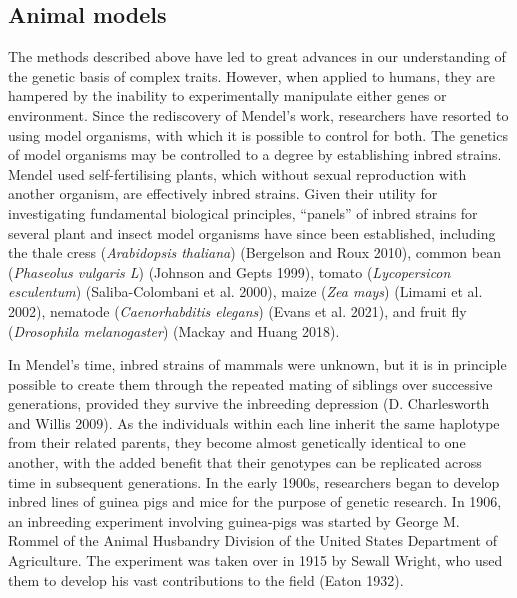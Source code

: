 \documentclass[
]{book}
\begin{document}
\hypertarget{animal-models}{%
\subsection{Animal models}\label{animal-models}}

The methods described above have led to great advances in our understanding of the genetic basis of complex traits. However, when applied to humans, they are hampered by the inability to experimentally manipulate either genes or environment. Since the rediscovery of Mendel's work, researchers have resorted to using model organisms, with which it is possible to control for both. The genetics of model organisms may be controlled to a degree by establishing inbred strains. Mendel used self-fertilising plants, which without sexual reproduction with another organism, are effectively inbred strains. Given their utility for investigating fundamental biological principles, ``panels'' of inbred strains for several plant and insect model organisms have since been established, including the thale cress (\emph{Arabidopsis thaliana}) (Bergelson and Roux 2010), common bean (\emph{Phaseolus vulgaris L}) (Johnson and Gepts 1999), tomato (\emph{Lycopersicon esculentum}) (Saliba-Colombani et al. 2000), maize (\emph{Zea mays}) (Limami et al. 2002), nematode (\emph{Caenorhabditis elegans}) (Evans et al. 2021), and fruit fly (\emph{Drosophila melanogaster}) (Mackay and Huang 2018).

In Mendel's time, inbred strains of mammals were unknown, but it is in principle possible to create them through the repeated mating of siblings over successive generations, provided they survive the inbreeding depression (D. Charlesworth and Willis 2009). As the individuals within each line inherit the same haplotype from their related parents, they become almost genetically identical to one another, with the added benefit that their genotypes can be replicated across time in subsequent generations. In the early 1900s, researchers began to develop inbred lines of guinea pigs and mice for the purpose of genetic research. In 1906, an inbreeding experiment involving guinea-pigs was started by George M. Rommel of the Animal Husbandry Division of the United States Department of Agriculture. The experiment was taken over in 1915 by Sewall Wright, who used them to develop his vast contributions to the field (Eaton 1932).
\end{document}
